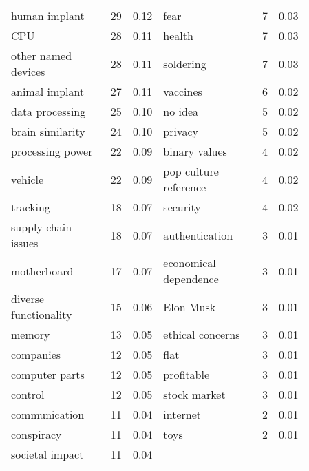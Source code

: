 \begin{table*}[htb]
\begin{tabularx}{\linewidth}{L{0.35\linewidth}R{0.04\linewidth}R{0.04\linewidth}|L{0.35\linewidth}R{0.04\linewidth}R{0.04\linewidth}}
        human implant & 29 & 0.12 & fear & 7 & 0.03 \\
        CPU & 28 & 0.11 & health & 7 & 0.03 \\
        other named devices & 28 & 0.11 & soldering & 7 & 0.03 \\
        animal implant & 27 & 0.11 & vaccines & 6 & 0.02 \\
        data processing & 25 & 0.10 & no idea & 5 & 0.02 \\
        brain similarity & 24 & 0.10 & privacy & 5 & 0.02 \\
        processing power & 22 & 0.09 & binary values & 4 & 0.02 \\
        vehicle & 22 & 0.09 & pop culture reference & 4 & 0.02 \\
        tracking & 18 & 0.07 & security & 4 & 0.02 \\
        supply chain issues & 18 & 0.07 & authentication & 3 & 0.01 \\
        motherboard & 17 & 0.07 & economical dependence & 3 & 0.01 \\
        diverse functionality & 15 & 0.06 & Elon Musk & 3 & 0.01 \\
        memory & 13 & 0.05 & ethical concerns & 3 & 0.01 \\
        companies & 12 & 0.05 & flat & 3 & 0.01 \\
        computer parts & 12 & 0.05 & profitable & 3 & 0.01 \\
        control & 12 & 0.05 & stock market & 3 & 0.01 \\
        communication & 11 & 0.04 & internet & 2 & 0.01 \\
        conspiracy & 11 & 0.04 & toys & 2 & 0.01 \\
        societal impact & 11 & 0.04 &  & \\
        \bottomrule
    \end{tabularx}
\end{table*}

